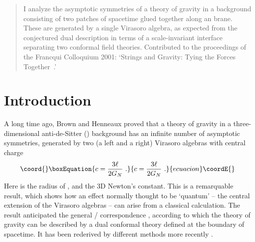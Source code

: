 \documentclass[a4paper,12pt,oneside]{article}
\begin{document}
\begin{quote}\small
I analyze  the asymptotic symmetries of 
a theory of gravity in a 
background consisting of two patches of \coordHE{}  spacetime
glued together along an  \coordHE{} brane. 
These  are generated by a  single Virasoro algebra, 
as expected from  the conjectured dual description
in terms of a scale-invariant 
interface separating two conformal field theories. 
Contributed  to the proceedings of
the Francqui Colloquium 2001: `Strings and Gravity:
Tying the Forces Together~.'



\end{quote}

\baselineskip18pt

\newpage



\setcounter{equation}{0}
\section{Introduction}

  A long time ago, Brown and Henneaux \cite{BH} proved that 
a theory of gravity in a
three-dimensional anti-de-Sitter (\coordHE{}) background has 
an infinite number of asymptotic symmetries, 
generated by two (a left and a right) 
Virasoro algebras   with central charge
\begin{equation}\coord{}\boxEquation{
 c = {3\ell\over 2  G_N}\ .
}{
 c = {3\ell\over 2  G_N}\ .
}{ecuacion}\coordE{}\end{equation}
\vskip 0.1cm \noindent
Here \myHighlight{$\ell$}\coordHE{} is the radius of
 \coordHE{},  and \coordHE{} the 3D  Newton's constant. 
This is a  remarquable result,  which  shows  how an effect normally 
thought to be  `quantum'  -- the central extension 
of the Virasoro algebras  
--  can arise  from a  classical calculation. 
The result anticipated
the  general \coordHE{}/\coordHE{} correspondence \cite{M12}, 
according to which the theory of gravity can be described
by a dual  conformal  theory defined  
at the boundary of  spacetime. It has been rederived by different methods
more recently \cite{HSken,BK,dSS,adam}. 
\end{document}
